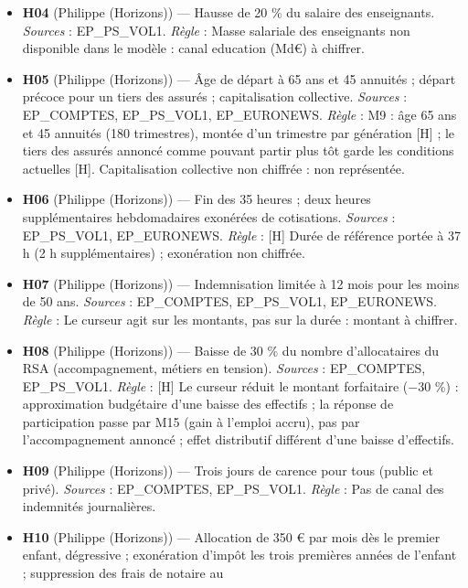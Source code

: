 \documentclass[
  11pt,
  11pt,
  a4paper,
  openany]{book}
\begin{document}
\begin{itemize}
  fonctions de bureau). \emph{Sources} : EP\_COMPTES, EP\_PS\_VOL1.
  \emph{Règle} : Effectif atteint en 5 ans ; coût moyen du simulateur 56
  k€ par agent.
\item
  \textbf{H04} (Philippe (Horizons)) --- Hausse de 20 \% du salaire des
  enseignants. \emph{Sources} : EP\_PS\_VOL1. \emph{Règle} : Masse
  salariale des enseignants non disponible dans le modèle : canal
  education (Md€) à chiffrer.
\item
  \textbf{H05} (Philippe (Horizons)) --- Âge de départ à 65 ans et 45
  annuités ; départ précoce pour un tiers des assurés ; capitalisation
  collective. \emph{Sources} : EP\_COMPTES, EP\_PS\_VOL1, EP\_EURONEWS.
  \emph{Règle} : M9 : âge 65 ans et 45 annuités (180 trimestres), montée
  d'un trimestre par génération {[}H{]} ; le tiers des assurés annoncé
  comme pouvant partir plus tôt garde les conditions actuelles {[}H{]}.
  Capitalisation collective non chiffrée : non représentée.
\item
  \textbf{H06} (Philippe (Horizons)) --- Fin des 35 heures ; deux heures
  supplémentaires hebdomadaires exonérées de cotisations. \emph{Sources}
  : EP\_PS\_VOL1, EP\_EURONEWS. \emph{Règle} : {[}H{]} Durée de
  référence portée à 37 h (2 h supplémentaires) ; exonération non
  chiffrée.
\item
  \textbf{H07} (Philippe (Horizons)) --- Indemnisation limitée à 12 mois
  pour les moins de 50 ans. \emph{Sources} : EP\_COMPTES, EP\_PS\_VOL1,
  EP\_EURONEWS. \emph{Règle} : Le curseur agit sur les montants, pas sur
  la durée : montant à chiffrer.
\item
  \textbf{H08} (Philippe (Horizons)) --- Baisse de 30 \% du nombre
  d'allocataires du RSA (accompagnement, métiers en tension).
  \emph{Sources} : EP\_COMPTES, EP\_PS\_VOL1. \emph{Règle} : {[}H{]} Le
  curseur réduit le montant forfaitaire (−30 \%) : approximation
  budgétaire d'une baisse des effectifs ; la réponse de participation
  passe par M15 (gain à l'emploi accru), pas par l'accompagnement
  annoncé ; effet distributif différent d'une baisse d'effectifs.
\item
  \textbf{H09} (Philippe (Horizons)) --- Trois jours de carence pour
  tous (public et privé). \emph{Sources} : EP\_COMPTES, EP\_PS\_VOL1.
  \emph{Règle} : Pas de canal des indemnités journalières.
\item
  \textbf{H10} (Philippe (Horizons)) --- Allocation de 350 € par mois
  dès le premier enfant, dégressive ; exonération d'impôt les trois
  premières années de l'enfant ; suppression des frais de notaire au

\end{itemize}
\end{document}
